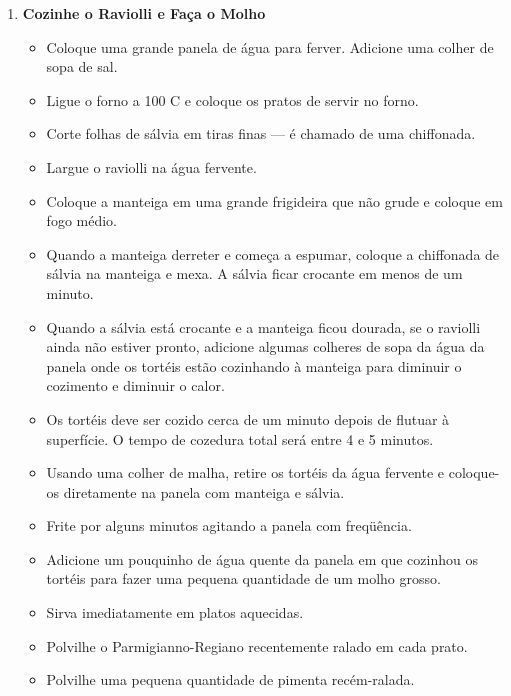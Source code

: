 \documentclass [11pt, letterpaper] {article}
\begin{document}
\begin {description}
\begin {enumerate}
\item {\bf Cozinhe o Raviolli e Faça o Molho}
\begin {itemize}
\item Coloque uma grande panela de água para ferver. Adicione uma colher de sopa de sal.
\item Ligue o forno a 100 C e coloque os pratos de servir no forno.
\item Corte folhas de sálvia em tiras finas --- é chamado de uma chiffonada.
\item Largue o raviolli na água fervente.
\item Coloque a manteiga em uma grande frigideira que n\~ao grude e coloque em fogo médio.
\item Quando a manteiga derreter e começa a espumar, coloque a chiffonada de sálvia na manteiga e mexa. A s\'alvia ficar crocante  em menos de um minuto.
\item Quando a s\'alvia est\'a crocante e a manteiga ficou dourada, se o raviolli ainda não estiver pronto, adicione algumas colheres de sopa da água da panela onde os tort\'eis est\~ao cozinhando à manteiga para diminuir o cozimento e diminuir o calor.
\item Os tort\'eis deve ser cozido cerca de um minuto depois de flutuar \`a superfície. O tempo de cozedura total será entre 4 e 5 minutos.
\item Usando uma colher de malha, retire os tort\'eis da água fervente e coloque-os diretamente na panela com manteiga e sálvia.
\item Frite por alguns minutos agitando a panela com freqüência.
\item Adicione um pouquinho de água quente da panela em que cozinhou os tort\'eis para fazer uma pequena quantidade de um molho grosso.
\item Sirva imediatamente em platos aquecidas.
\item Polvilhe o Parmigianno-Regiano recentemente ralado em cada prato.
\item Polvilhe uma pequena quantidade de pimenta recém-ralada.
\end {itemize}

\end {enumerate}
\end {description}
\end{document}
